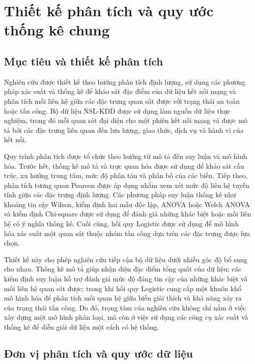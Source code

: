 \documentclass[../main.tex]{subfiles}
\begin{document}
\section{Thiết kế phân tích và quy ước thống kê chung}

\subsection{Mục tiêu và thiết kế phân tích}

Nghiên cứu được thiết kế theo hướng phân tích định lượng, sử dụng các phương pháp xác suất và thống kê để khảo sát đặc điểm của dữ liệu kết nối mạng và phân tích mối liên hệ giữa các đặc trưng quan sát được với trạng thái an toàn hoặc tấn công. Bộ dữ liệu NSL-KDD được sử dụng làm nguồn dữ liệu thực nghiệm, trong đó mỗi quan sát đại diện cho một phiên kết nối mạng và được mô tả bởi các đặc trưng liên quan đến lưu lượng, giao thức, dịch vụ và hành vi của kết nối.

Quy trình phân tích được tổ chức theo hướng từ mô tả đến suy luận và mô hình hóa. Trước hết, thống kê mô tả và trực quan hóa được sử dụng để khảo sát cấu trúc, xu hướng trung tâm, mức độ phân tán và phân bố của các biến. Tiếp theo, phân tích tương quan Pearson được áp dụng nhằm xem xét mức độ liên hệ tuyến tính giữa các đặc trưng định lượng. Các phương pháp suy luận thống kê như khoảng tin cậy Wilson, kiểm định hai mẫu độc lập, ANOVA hoặc Welch ANOVA và kiểm định Chi-square được sử dụng để đánh giá những khác biệt hoặc mối liên hệ có ý nghĩa thống kê. Cuối cùng, hồi quy Logistic được sử dụng để mô hình hóa xác suất một quan sát thuộc nhóm tấn công dựa trên các đặc trưng được lựa chọn.

Thiết kế này cho phép nghiên cứu tiếp cận bộ dữ liệu dưới nhiều góc độ bổ sung cho nhau. Thống kê mô tả giúp nhận diện đặc điểm tổng quát của dữ liệu; các kiểm định suy luận hỗ trợ đánh giá mức độ đáng tin cậy của những khác biệt và mối liên hệ quan sát được; trong khi hồi quy Logistic cung cấp một khuôn khổ mô hình hóa để phân tích mối quan hệ giữa biến giải thích và khả năng xảy ra của trạng thái tấn công. Do đó, trọng tâm của nghiên cứu không chỉ nằm ở việc xây dựng một mô hình phân loại, mà còn ở việc sử dụng các công cụ xác suất và thống kê để diễn giải dữ liệu một cách có hệ thống.

\subsection{Đơn vị phân tích và quy ước dữ liệu}
\end{document}
